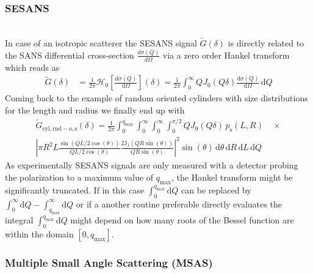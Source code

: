 \subsubsection{SESANS} ~\\
In case of an isotropic scatterer the SESANS signal $\tilde{G}(\delta)$ is directly related to the SANS differential cross-section $\frac{d\sigma(Q)}{d\Omega}$ via a zero order Hankel transform \cite{Krouglov2003,Andersson2008,Kohlbrecher2017}which reads as
\begin{align}
\tilde{G}(\delta) &= \frac{1}{2\pi}\mathcal{H}_0\left[\frac{\mathrm{d}\sigma(Q)}{\mathrm{d}\Omega}\right](\delta)
= \frac{1}{2\pi} \int_{0}^{\infty} Q J_0(Q\delta) \frac{\mathrm{d}\sigma(Q)}{\mathrm{d}\Omega} \, \mathrm{d}Q
\end{align}
Coming back to the example of random oriented cylinders with size distributions for the length and radius we finally end up with
\begin{multline}  \label{eq.Fcyl_rndODF_SESANS}
\tilde{G}_{\mathrm{cyl},\mathrm{rnd-o},\mathrm{s}}(\delta) = \frac{1}{2\pi} \int_{0}^{q_\mathrm{max}} \! \int_0^\infty \!\int_0^\infty \!\int_0^{\pi/2} Q J_0(Q\delta) \, p_\mathrm{s}(L,R) \quad \times\\
 \left\vert \pi R^2L \frac{\sin(QL/2\cos(\theta))}{QL/2\cos(\theta)} \frac{2\textrm{J}_1(QR\sin(\theta))}{QR\sin(\theta)}\right\vert^2 \sin(\theta) \, \mathrm{d}\theta  \, \mathrm{d}R\, \mathrm{d}L \, \mathrm{d}Q
\end{multline}
As experimentally SESANS signals are only measured with a detector probing the polarization to a maximum value of $q_\mathrm{max}$, the Hankel transform might be significantly truncated. If in this case $\int_{0}^{q_\mathrm{max}} \mathrm{d}Q$ can be replaced by $\int_{0}^{\infty} \mathrm{d}Q-\int_{q_\mathrm{max}}^\infty \mathrm{d}Q$ or if a another routine preferable directly evaluates the integral  $\int_{0}^{q_\mathrm{max}} \mathrm{d}Q$ might depend on how many roots of the Bessel function are within the domain $[0,q_\mathrm{max}]$.

\subsubsection{Multiple Small Angle Scattering (MSAS)} ~\\

